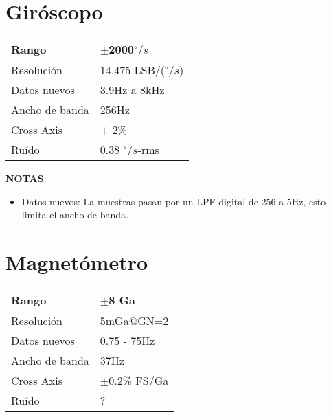 \documentclass[spanish,12pt,a4paper,titlepage]{report}
\begin{document}
\section{Giróscopo}
\label{sec:gyro}

\begin{table}[H]
\begin{center}
\begin{tabular}{|p{3cm}|p{6.5cm}|}
\hline
Rango & $\pm$2000$^\circ/s$ \\
\hline
Resolución & 14.475 LSB/($^\circ/s$) \\
\hline
Datos nuevos &  3.9Hz a 8kHz\\
\hline
Ancho de banda & 256Hz \\
\hline
Cross Axis & $\pm$ 2\% \\
\hline
Ruído & 0.38 $^\circ/s$-rms \\
\hline
\end{tabular}
\label{tab:gyro}
\end{center}
\end{table}

\textbf{NOTAS}:
\begin{itemize}
\item Datos nuevos: La muestras pasan por un LPF digital de 256 a 5Hz, esto limita el ancho de banda.
\end{itemize}

\newpage
\section{Magnetómetro}
\label{sec:magnetometro}

\begin{table}[H]
\begin{center}
\begin{tabular}{|p{3cm}|p{6.5cm}|}
\hline
Rango & $\pm$8 Ga\\
\hline
Resolución &  5mGa@GN=2\\
\hline
Datos nuevos &  0.75 - 75Hz\\
\hline
Ancho de banda &  37Hz\\
\hline
Cross Axis & $\pm$0.2\% FS/Ga \\
\hline
Ruído & ? \\
\hline
\end{tabular}
\label{tab:magn}
\end{center}
\end{table}
\end{document}
